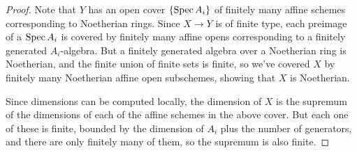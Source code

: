 \begin{proof}
	Note that $Y$ has an open cover $\{\operatorname{Spec} A_i\}$ of finitely many affine schemes corresponding to Noetherian rings. Since $X \to Y$ is of finite type, each preimage of a $\operatorname{Spec} A_i$ is covered by finitely many affine opens corresponding to a finitely generated $A_i$-algebra. But a finitely generated algebra over a Noetherian ring is Noetherian, and the finite union of finite sets is finite, so we've covered $X$ by finitely many Noetherian affine open subschemes, showing that $X$ is Noetherian.
	
	Since dimensions can be computed locally, the dimension of $X$ is the supremum of the dimensions of each of the affine schemes in the above cover. But each one of these is finite, bounded by the dimension of $A_i$ plus the number of generators, and there are only finitely many of them, so the supremum is also finite.
\end{proof}
